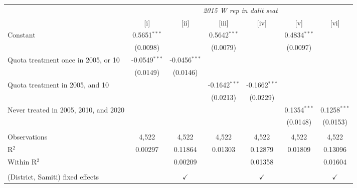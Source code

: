 
\begingroup
\centering
\begin{tabular}{lcccccc}
   \toprule
    & \multicolumn{6}{c}{\textit{2015 W rep in dalit seat}}\\
                                         & [i]             & [ii]            & [iii]           & [iv]            & [v]            & [vi]\\  
   \midrule 
   Constant                              & 0.5651$^{***}$  &                 & 0.5642$^{***}$  &                 & 0.4834$^{***}$ &   \\   
                                         & (0.0098)        &                 & (0.0079)        &                 & (0.0097)       &   \\   
   Quota treatment once in 2005, or 10   & -0.0549$^{***}$ & -0.0456$^{***}$ &                 &                 &                &   \\   
                                         & (0.0149)        & (0.0146)        &                 &                 &                &   \\   
   Quota treatment in 2005, and 10       &                 &                 & -0.1642$^{***}$ & -0.1662$^{***}$ &                &   \\   
                                         &                 &                 & (0.0213)        & (0.0229)        &                &   \\   
   Never treated in 2005, 2010, and 2020 &                 &                 &                 &                 & 0.1354$^{***}$ & 0.1258$^{***}$\\   
                                         &                 &                 &                 &                 & (0.0148)       & (0.0153)\\   
    \\
   Observations                          & 4,522           & 4,522           & 4,522           & 4,522           & 4,522          & 4,522\\  
   R$^2$                                 & 0.00297         & 0.11864         & 0.01303         & 0.12879         & 0.01809        & 0.13096\\  
   Within R$^2$                          &                 & 0.00209         &                 & 0.01358         &                & 0.01604\\  
    \\
   (District, Samiti) fixed effects      &                 & $\checkmark$    &                 & $\checkmark$    &                & $\checkmark$\\   
   \bottomrule
\end{tabular}
\par\endgroup


